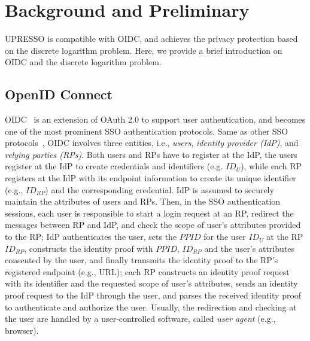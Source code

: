 \section{Background and Preliminary}
\label{sec:background}
UPRESSO is compatible with OIDC, and achieves the privacy protection based on the discrete logarithm problem.
Here, we provide a brief introduction on OIDC and the discrete logarithm problem.

\subsection{OpenID Connect}
\label{subsec:OIDC}
OIDC~\cite{OpenIDConnect} is an extension of OAuth 2.0 to support user authentication,
 and becomes one of the most prominent SSO authentication protocols.
Same as other SSO protocols~\cite{SAMLIdentifier}, OIDC involves three entities, i.e., {\em users}, {\em identity provider (IdP)}, and {\em relying parties (RPs)}.
Both users and RPs have to register at the IdP,    
the users register at the IdP to create credentials and identifiers (e.g. $ID_U$), %
while each RP registers at the IdP with its endpoint information to create its unique identifier (e.g., $ID_{RP}$) and the corresponding credential.
IdP is assumed to securely maintain the attributes  of users and RPs.   
Then, in the SSO authentication sessions, 
 each user is responsible to start a login request at an RP, redirect the messages between RP and IdP, and check the scope of user's attributes provided to the RP;
 IdP authenticates the user, sets the $PPID$ for the user $ID_U$ at the RP $ID_{RP}$,
 constructs the identity proof with  $PPID$, $ID_{RP}$ and the user's attributes consented by the user, and finally transmits the identity proof to the RP's registered endpoint (e.g., URL);
 each RP constructs an identity proof request with its identifier and the requested scope of  user's attributes, sends an identity proof request to the IdP through the user, and parses the received identity proof to authenticate and authorize the user.
Usually, the redirection and checking at the user are handled by a user-controlled software, called {\em user agent} (e.g., browser).



